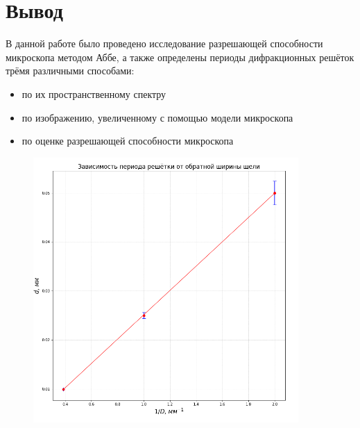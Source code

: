 \documentclass[a4paper,12pt]{article}
\begin{document}

\section{Вывод}
В данной работе было проведено исследование разрешающей способности микроскопа методом Аббе, а также определены периоды дифракционных решёток трёмя различными способами:
\begin{itemize}
    \item
    по их пространственному спектру
    
    \item
    по изображению, увеличенному с помощью модели микроскопа
    
    \item
    по оценке разрешающей способности микроскопа
    
\end{itemize}

\newpage
\begin{figure}[H]\label{fig: d(D-1)}
    \centering
    \includegraphics[width = 0.9\textwidth]{d(D-1).png}
\end{figure}

\end{document}
